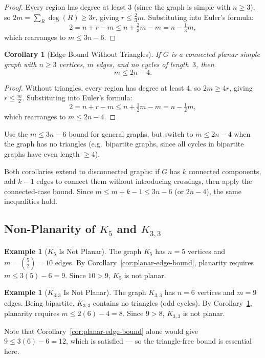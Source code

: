 \documentclass[11pt, a4paper, notitlepage]{report}
\newtheorem{corollary}[theorem]{Corollary}
\theoremstyle{definition}
\newtheorem{example}[theorem]{Example}
\theoremstyle{remark}
\begin{document}
\begin{proof}
Every region has degree at least $3$ (since the graph is simple with $n \geq 3$), so $2m = \sum_R \deg(R) \geq 3r$, giving $r \leq \frac{2}{3}m$. Substituting into Euler's formula:
\[
2 = n + r - m \leq n + \tfrac{2}{3}m - m = n - \tfrac{1}{3}m,
\]
which rearranges to $m \leq 3n - 6$.
\end{proof}

\begin{corollary}[Edge Bound Without Triangles]
\label{cor:planar-no-triangles}
If $G$ is a connected planar simple graph with $n \geq 3$ vertices, $m$ edges, and no cycles of length~$3$, then
\[
m \leq 2n - 4.
\]
\end{corollary}

\begin{proof}
Without triangles, every region has degree at least $4$, so $2m \geq 4r$, giving $r \leq \frac{m}{2}$. Substituting into Euler's formula:
\[
2 = n + r - m \leq n + \tfrac{1}{2}m - m = n - \tfrac{1}{2}m,
\]
which rearranges to $m \leq 2n - 4$.
\end{proof}

\begin{examtip}[title={Exam Tip: Choosing the Right Corollary}]
Use the $m \leq 3n - 6$ bound for general graphs, but switch to $m \leq 2n - 4$ when the graph has no triangles (e.g.\ bipartite graphs, since all cycles in bipartite graphs have even length $\geq 4$).
\end{examtip}

Both corollaries extend to disconnected graphs: if $G$ has $k$ connected components, add $k-1$ edges to connect them without introducing crossings, then apply the connected-case bound. Since $m \leq m + k - 1 \leq 3n - 6$ (or $2n - 4$), the same inequalities hold.

\subsection{Non-Planarity of $K_5$ and $K_{3,3}$}
\label{subsec:nonplanar-k5-k33}

\begin{example}[$K_5$ Is Not Planar]
\label{ex:k5-nonplanar}
The graph $K_5$ has $n = 5$ vertices and $m = \binom{5}{2} = 10$ edges. By Corollary~\ref{cor:planar-edge-bound}, planarity requires $m \leq 3(5) - 6 = 9$. Since $10 > 9$, $K_5$ is not planar.
\end{example}

\begin{example}[$K_{3,3}$ Is Not Planar]
\label{ex:k33-nonplanar-proof}
The graph $K_{3,3}$ has $n = 6$ vertices and $m = 9$ edges. Being bipartite, $K_{3,3}$ contains no triangles (odd cycles). By Corollary~\ref{cor:planar-no-triangles}, planarity requires $m \leq 2(6) - 4 = 8$. Since $9 > 8$, $K_{3,3}$ is not planar.

Note that Corollary~\ref{cor:planar-edge-bound} alone would give $9 \leq 3(6) - 6 = 12$, which is satisfied --- so the triangle-free bound is essential here.
\end{example}
\end{document}
